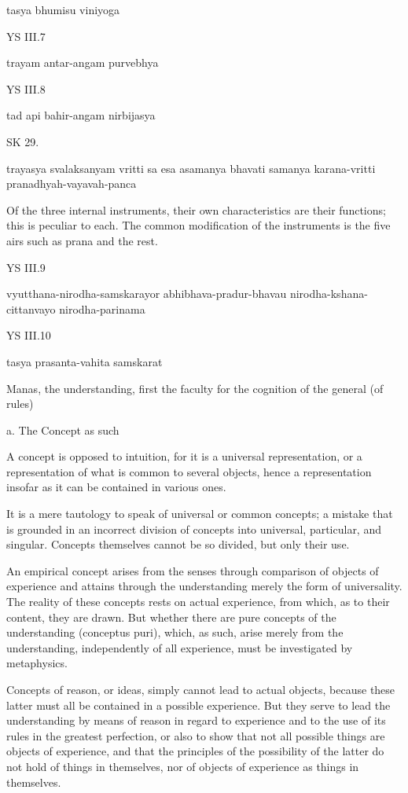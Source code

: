     tasya bhumisu viniyoga

YS III.7

    trayam antar-angam purvebhya

YS III.8

    tad api bahir-angam nirbijasya

SK 29.

trayasya svalaksanyam vritti sa esa asamanya bhavati
samanya karana-vritti pranadhyah-vayavah-panca

Of the three internal instruments, their own characteristics are their functions;
this is peculiar to each.
The common modification of the instruments is the five airs
such as prana and the rest.

YS III.9

    vyutthana-nirodha-samskarayor abhibhava-pradur-bhavau nirodha-kshana-cittanvayo nirodha-parinama

YS III.10

    tasya prasanta-vahita samskarat

    Manas, the understanding, first the faculty for the cognition of the general (of rules)

    a. The Concept as such

    A concept is opposed to intuition, for it is a universal representation,
    or a representation of what is common to several objects,
    hence a representation insofar as it can be contained in various ones.

    It is a mere tautology to speak of universal or common concepts;
    a mistake that is grounded in an incorrect division of concepts into
    universal, particular, and singular.
    Concepts themselves cannot be so divided, but only their use.

    An empirical concept arises from the senses through comparison of
    objects of experience and attains through the understanding merely
    the form of universality.
    The reality of these concepts rests on actual experience,
    from which, as to their content, they are drawn.
    But whether there are pure concepts of the understanding (conceptus puri),
    which, as such, arise merely from the understanding,
    independently of all experience, must be investigated by metaphysics.

    Concepts of reason, or ideas, simply cannot lead to actual objects,
    because these latter must all be contained in a possible experience.
    But they serve to lead the understanding by means of reason in regard to
    experience and to the use of its rules in the greatest perfection, or also
    to show that not all possible things are objects of experience,
    and that the principles of the possibility of the latter do not hold of
    things in themselves, nor of objects of experience as things in themselves.

